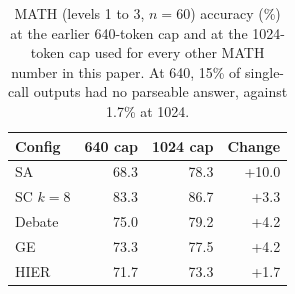 \begin{table}[t]\centering\small
\caption{MATH (levels 1 to 3, $n{=}60$) accuracy (\%) at the earlier 640-token cap and at the 1024-token cap used for every other MATH number in this paper. At 640, 15\% of single-call outputs had no parseable answer, against 1.7\% at 1024.}
\label{tab:trunc}
\begin{tabular}{lrrr}
\toprule
Config & 640 cap & 1024 cap & Change \\
\midrule
SA & 68.3 & 78.3 & +10.0 \\
SC $k{=}8$ & 83.3 & 86.7 & +3.3 \\
Debate & 75.0 & 79.2 & +4.2 \\
GE & 73.3 & 77.5 & +4.2 \\
HIER & 71.7 & 73.3 & +1.7 \\
\bottomrule
\end{tabular}
\end{table}
